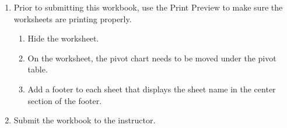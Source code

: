 \begin{enumerate}[resume]
	\item Prior to submitting this workbook, use the Print Preview to make sure the worksheets are printing properly.
	
	\begin{enumerate}
		\item Hide the  worksheet.
		\item On the  worksheet, the pivot chart needs to be moved under the pivot table.
		\item Add a footer to each sheet that displays the sheet name in the center section of the footer.
	\end{enumerate}
	
	\item Submit the  workbook to the instructor.
\end{enumerate}